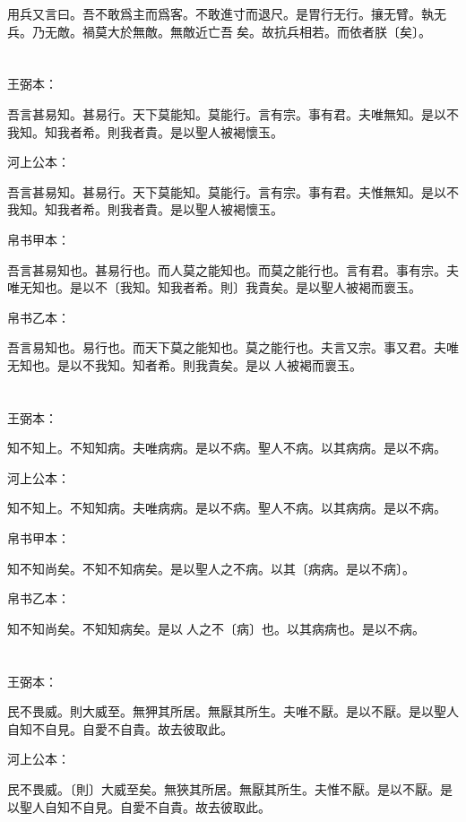 \documentclass[a5paper]{ctexbook}
\begin{document}
    用兵又言曰。吾不敢爲主而爲客。不敢進寸而退尺。是胃行无行。攘无臂。執无兵。乃无敵。禍莫大於無敵。無敵近亡吾𤥯矣。故抗兵相若。而依者朕〔矣〕。

    \chapter{}
    王弼本：

    吾言甚易知。甚易行。天下莫能知。莫能行。言有宗。事有君。夫唯無知。是以不我知。知我者希。則我者貴。是以聖人被褐懷玉。

    河上公本：

    吾言甚易知。甚易行。天下莫能知。莫能行。言有宗。事有君。夫惟無知。是以不我知。知我者希。則我者貴。是以聖人被褐懷玉。

    帛书甲本：

    吾言甚易知也。甚易行也。而人莫之能知也。而莫之能行也。言有君。事有宗。夫唯无知也。是以不〔我知。知我者希。則〕我貴矣。是以聖人被褐而褱玉。

    帛书乙本：

    吾言易知也。易行也。而天下莫之能知也。莫之能行也。夫言又宗。事又君。夫唯无知也。是以不我知。知者希。則我貴矣。是以𦔻人被褐而褱玉。

    \chapter{}
    王弼本：

    知不知上。不知知病。夫唯病病。是以不病。聖人不病。以其病病。是以不病。

    河上公本：

    知不知上。不知知病。夫唯病病。是以不病。聖人不病。以其病病。是以不病。

    帛书甲本：

    知不知尚矣。不知不知病矣。是以聖人之不病。以其〔病病。是以不病〕。

    帛书乙本：

    知不知尚矣。不知知病矣。是以𦔻人之不〔病〕也。以其病病也。是以不病。

    \chapter{}
    王弼本：

    民不畏威。則大威至。無狎其所居。無厭其所生。夫唯不厭。是以不厭。是以聖人自知不自見。自愛不自貴。故去彼取此。

    河上公本：

    民不畏威。〔則〕大威至矣。無狹其所居。無厭其所生。夫惟不厭。是以不厭。是以聖人自知不自見。自愛不自貴。故去彼取此。
\end{document}
